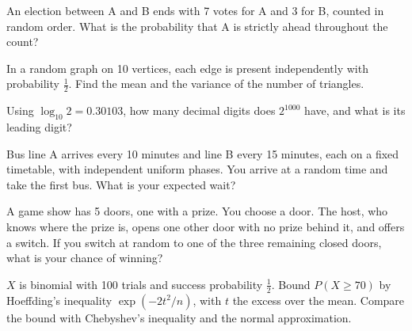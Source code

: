 
\begin{question}\label{iq:iv1:timed-test-5:7}
An election between A and B ends with 7 votes for A and 3 for B, counted in random order. What is the probability that A is strictly ahead throughout the count?
\end{question}

\begin{question}\label{iq:iv1:timed-test-5:8}
In a random graph on 10 vertices, each edge is present independently with probability $\frac12$. Find the mean and the variance of the number of triangles.
\end{question}

\begin{question}\label{iq:iv1:timed-test-5:9}
Using $\log_{10}2 = 0.30103$, how many decimal digits does $2^{1000}$ have, and what is its leading digit?
\end{question}

\begin{question}\label{iq:iv1:timed-test-5:10}
Bus line A arrives every 10 minutes and line B every 15 minutes, each on a fixed timetable, with independent uniform phases. You arrive at a random time and take the first bus. What is your expected wait?
\end{question}

\begin{question}\label{iq:iv1:timed-test-5:11}
A game show has 5 doors, one with a prize. You choose a door. The host, who knows where the prize is, opens one other door with no prize behind it, and offers a switch. If you switch at random to one of the three remaining closed doors, what is your chance of winning?
\end{question}

\begin{question}\label{iq:iv1:timed-test-5:12}
$X$ is binomial with 100 trials and success probability $\frac12$. Bound $P(X \ge 70)$ by Hoeffding's inequality $\exp(-2t^2/n)$, with $t$ the excess over the mean. Compare the bound with Chebyshev's inequality and the normal approximation.
\end{question}
